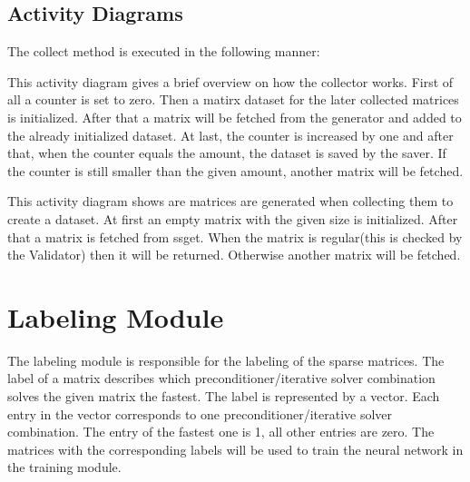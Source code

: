 \documentclass[parskip=full]{scrartcl}
\begin{document}
\subsection{Activity Diagrams}
The collect method is executed in the following manner:
\newpage
\begin{figure}[h]
\begin{center}

\label{Activity Diagrams}
\end{center}
\end{figure}
\newpage


This activity diagram gives a brief overview on how the collector works.
First of all a counter is set to zero. Then a matirx dataset for the later collected matrices is initialized.
After that a matrix will be fetched from the generator and added to the already initialized dataset.
At last, the counter is increased by one and after that, when the counter equals the amount, the dataset is saved by the saver.
If the counter is still smaller than the given amount, another matrix will be fetched. 

\newpage
\begin{figure}[h]
\begin{center}

\label{Activity Diagrams}
\end{center}
\end{figure}
\newpage

This activity diagram shows are matrices are generated when collecting them to create a dataset.
At first an empty matrix with the given size is initialized.
After that a matrix is fetched from ssget. When the matrix is regular(this is checked by the Validator) then it will be returned.
Otherwise another matrix will be fetched.

\section{Labeling Module}
The labeling module is responsible for the labeling of the sparse matrices.
The \gls{label} of a matrix describes which \gls{preconditioner}/\gls{iterative solver} combination solves the given matrix the fastest. 
The \gls{label} is represented by a vector. 
Each entry in the vector corresponds to one \gls{preconditioner}/\gls{iterative solver} combination. 
The entry of the fastest one is 1, all other entries are zero. 
The matrices with the corresponding \glspl{label} will be used to train the \gls{neural network} in the training module.
\end{document}
